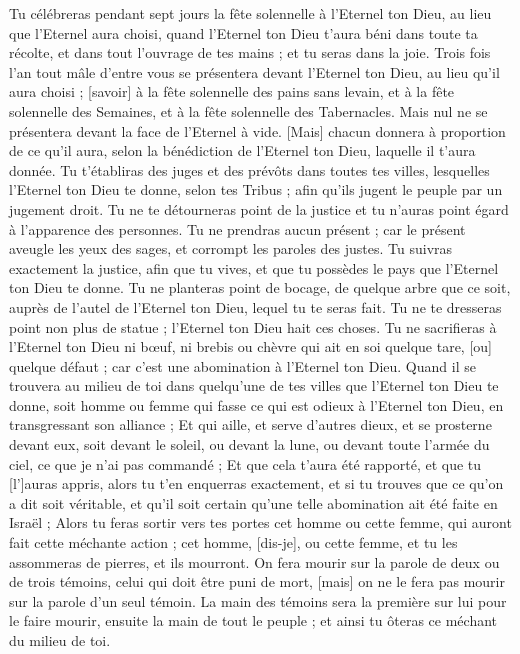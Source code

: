 \begin{multicols}{2}
Tu célébreras pendant sept jours la fête solennelle à l'Eternel ton Dieu, au lieu que l'Eternel aura choisi, quand l'Eternel ton Dieu t'aura béni dans toute ta récolte, et dans tout l'ouvrage de tes mains ; et tu seras dans la joie.
Trois fois l'an tout mâle d'entre vous se présentera devant l'Eternel ton Dieu, au lieu qu'il aura choisi ; [savoir] à la fête solennelle des pains sans levain, et à la fête solennelle des Semaines, et à la fête solennelle des Tabernacles. Mais nul ne se présentera devant la face de l'Eternel à vide.
[Mais] chacun donnera à proportion de ce qu'il aura, selon la bénédiction de l'Eternel ton Dieu, laquelle il t'aura donnée.
Tu t'établiras des juges et des prévôts dans toutes tes villes, lesquelles l'Eternel ton Dieu te donne, selon tes Tribus ; afin qu'ils jugent le peuple par un jugement droit.
Tu ne te détourneras point de la justice et tu n'auras point égard à l'apparence des personnes. Tu ne prendras aucun présent ; car le présent aveugle les yeux des sages, et corrompt les paroles des justes.
Tu suivras exactement la justice, afin que tu vives, et que tu possèdes le pays que l'Eternel ton Dieu te donne.
Tu ne planteras point de bocage, de quelque arbre que ce soit, auprès de l'autel de l'Eternel ton Dieu, lequel tu te seras fait.
Tu ne te dresseras point non plus de statue ; l'Eternel ton Dieu hait ces choses.
\VerseOne{}Tu ne sacrifieras à l'Eternel ton Dieu ni bœuf, ni brebis ou chèvre qui ait en soi quelque tare, [ou] quelque défaut ; car c'est une abomination à l'Eternel ton Dieu.
Quand il se trouvera au milieu de toi dans quelqu'une de tes villes que l'Eternel ton Dieu te donne, soit homme ou femme qui fasse ce qui est odieux à l'Eternel ton Dieu, en transgressant son alliance ;
Et qui aille, et serve d'autres dieux, et se prosterne devant eux, soit devant le soleil, ou devant la lune, ou devant toute l'armée du ciel, ce que je n'ai pas commandé ;
Et que cela t'aura été rapporté, et que tu [l']auras appris, alors tu t'en enquerras exactement, et si tu trouves que ce qu'on a dit soit véritable, et qu'il soit certain qu'une telle abomination ait été faite en Israël ;
Alors tu feras sortir vers tes portes cet homme ou cette femme, qui auront fait cette méchante action ; cet homme, [dis-je], ou cette femme, et tu les assommeras de pierres, et ils mourront.
On fera mourir sur la parole de deux ou de trois témoins, celui qui doit être puni de mort, [mais] on ne le fera pas mourir sur la parole d'un seul témoin.
La main des témoins sera la première sur lui pour le faire mourir, ensuite la main de tout le peuple ; et ainsi tu ôteras ce méchant du milieu de toi.

\end{multicols}
